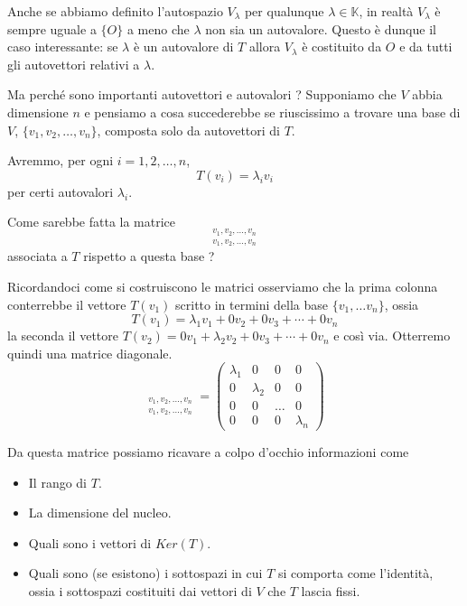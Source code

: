 Anche se abbiamo definito l'autospazio $V_\lambda$ per qualunque
$\lambda \in \mathbb{K}$, in realt\`a $V_\lambda$ \`e sempre uguale a $\{O\}$ a
meno che $\lambda$ non sia un autovalore. Questo \`e dunque il caso interessante:
se $\lambda$ \`e un autovalore di $T$ allora $V_\lambda$ \`e costituito da $O$ e
da tutti gli autovettori relativi a $\lambda$.

Ma perch\'e sono importanti autovettori e autovalori ?
Supponiamo che $V$ abbia dimensione $n$ e pensiamo a cosa succederebbe se
riuscissimo a trovare una base di $V$, $\{v_1, v_2, \dots, v_n\}$, composta solo
da autovettori di $T$.

Avremmo, per ogni $i = 1, 2, \dots, n$,
\begin{equation*}
	T(v_i) = \lambda_i v_i
\end{equation*}
per certi autovalori $\lambda_i$.

Come sarebbe fatta la matrice
\begin{equation*}
	[T]_{\substack{
			v_1, v_2, \dots, v_n \\
			v_1, v_2, \dots, v_n
		}}
\end{equation*}
associata a $T$ rispetto a questa base ?

Ricordandoci come si costruiscono le matrici osserviamo che la prima colonna
conterrebbe il vettore $T(v_1)$ scritto in termini della base $\{v_1, \dots v_n\}$,
ossia
\begin{equation*}
	T(v_1) = \lambda_1 v_1 + 0 v_2 + 0 v_3 + \cdots + 0 v_n
\end{equation*}
la seconda il vettore $T(v_2) = 0 v_1 + \lambda_2 v_2 + 0 v_3 + \cdots + 0 v_n$ e
cos\`i via. Otterremo quindi una matrice diagonale.
\begin{equation*}
	[T]_{\substack{
			v_1, v_2, \dots, v_n \\
			v_1, v_2, \dots, v_n
		}} = \begin{pmatrix}
		\lambda_1 & 0         & 0     & 0         \\
		0         & \lambda_2 & 0     & 0         \\
		0         & 0         & \dots & 0         \\
		0         & 0         & 0     & \lambda_n
	\end{pmatrix}
\end{equation*}

Da questa matrice possiamo ricavare a colpo d'occhio informazioni come 
\begin{itemize}
	\item Il rango di $T$.
	\item La dimensione del nucleo.
	\item Quali sono i vettori di $Ker(T)$.
	\item Quali sono (se esistono) i sottospazi in cui $T$ si comporta come l'identit\`a,
	      ossia i sottospazi costituiti dai vettori di $V$ che $T$ lascia fissi.
\end{itemize}

